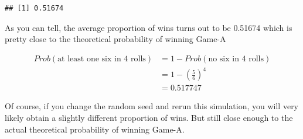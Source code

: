 \documentclass[
]{book}
\begin{document}
\begin{verbatim}
## [1] 0.51674
\end{verbatim}

As you can tell, the average proportion of wins turns out to be 0.51674 which is pretty close to the theoretical probability of winning Game-A

\begin{align*}
Prob(\text{at least one six in 4 rolls}) &= 1 - Prob(\text{no six in 4 rolls}) \\
&= 1 - \left( \frac{5}{6} \right)^4 \\
&= 0.517747
\end{align*}

Of course, if you change the random seed and rerun this simulation, you will
very likely obtain a slightly different proportion of wins. But still close
enough to the actual theoretical probability of winning Game-A.

  
\end{document}
